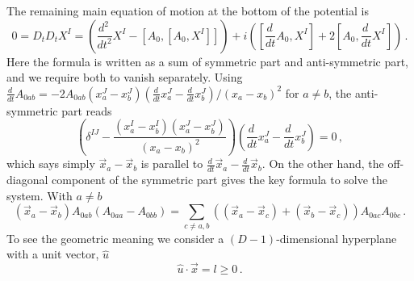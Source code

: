 \documentclass[a4paper,12pt]{article}
\begin{document}
The remaining main equation of motion at the bottom of the potential is
\begin{equation}
0=D_{t}D_{t}X^{I}=\left(\textstyle{\frac{d^{2}\,}{dt^{2}}}X^{I}-[A_{0},[A_{0},X^{I}]]\right)+i\left(
[\textstyle{\frac{d\,}{dt}}A_{0},X^{I}]+2[A_{0},\textstyle{\frac{d\,}{dt}}X^{I}]\right)\,.
\end{equation}
Here the formula is written  as a sum of  symmetric part and anti-symmetric part, and we require both to vanish separately. 
Using
$\frac{d\,}{dt}A_{0ab}=-2A_{0ab}(x_{a}^{J}-x_{b}^{J})(\frac{d\,}{dt}x_{a}^{J}-\frac{d\,}{dt}x_{b}^{J})/(x_{a}-x_{b})^{2}$
for $a\neq b$, the anti-symmetric part reads
\begin{equation}
\displaystyle{\left(\delta^{IJ}-\frac{(x_{a}^{I}-x_{b}^{I})(x_{a}^{J}-x_{b}^{J})}{(x_{a}-x_{b})^{2}}\right)}
(\textstyle{\frac{d\,}{dt}x_{a}^{J}-\frac{d\,}{dt}x_{b}^{J}})=0\,,
\end{equation}
which says simply $\vec{x}_{a}-\vec{x}_{b}$ is parallel to $\frac{d\,}{dt}\vec{x}_{a}-\frac{d\,}{dt}\vec{x}_{b}$. On the other hand,   
the  off-diagonal component of the symmetric part gives  the key formula to solve the system. With $a\neq b$
\begin{equation}
(\vec{x}_{a}-\vec{x}_{b})A_{0ab}(A_{0aa}-A_{0bb}) =\displaystyle{\sum_{c\neq a,b}\left((\vec{x}_{a}-\vec{x}_{c})
+(\vec{x}_{b}-\vec{x}_{c})\right)A_{0ac}A_{0bc}}\,.
\label{key}
\end{equation}
To see the geometric meaning we consider  a $(D-1)$-dimensional hyperplane with a unit vector, $\hat{u}$ 
\begin{equation}
\hat{u}\cdot\vec{x}=l\geq 0\,.
\end{equation}
\end{document}
